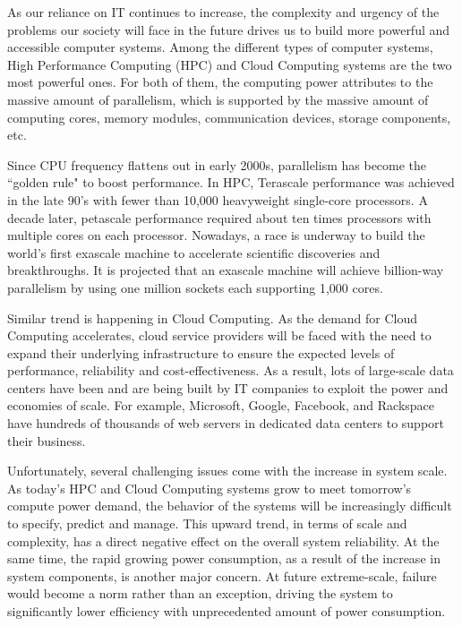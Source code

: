As our reliance on IT continues to increase, the complexity and urgency of the problems our society will face 
in the future drives us to build more powerful and accessible computer systems. Among the different types of 
computer systems, High Performance Computing (HPC) and Cloud Computing systems are the two most powerful ones. 
For both of them, the computing power attributes to the massive amount of parallelism, which is supported by 
the massive amount of computing cores, memory modules, communication devices, storage components, etc. 

Since CPU frequency flattens out in early 2000s, parallelism has become the ``golden rule" to boost performance. 
In HPC, Terascale performance was achieved in the late 90’s with fewer than 10,000 heavyweight single-core processors. 
A decade later, petascale performance required about ten times processors with multiple cores on each processor. Nowadays, a race
is underway to build the world's first exascale machine to accelerate scientific discoveries and breakthroughs. It is 
projected that an exascale machine will achieve billion-way parallelism by using one million sockets each supporting 
1,000 cores. 

Similar trend is happening in Cloud Computing. 
As the demand for Cloud Computing accelerates, cloud service providers  
will be faced with the need to expand their underlying infrastructure to ensure the expected levels of performance, reliability and cost-effectiveness. 
As a result, lots of large-scale data centers have been and are being built by IT companies
to exploit the power and economies of scale. 
For example, Microsoft, Google, Facebook, and Rackspace have hundreds of thousands 
of web servers in dedicated data centers to support their business. 

Unfortunately, several challenging issues come with the increase in system scale. As today's HPC and Cloud Computing systems grow to 
meet tomorrow's compute power demand, the behavior of the systems will be increasingly difficult to specify, predict and manage. 
This upward trend, in terms of scale and complexity, has a direct negative effect on the overall system reliability. 
At the same time, the rapid 
growing power consumption, as a result of the increase in system components, is another major concern. 
At future extreme-scale, failure would become a norm rather than an exception, 
driving the system to significantly lower efficiency with unprecedented amount of power consumption. 

